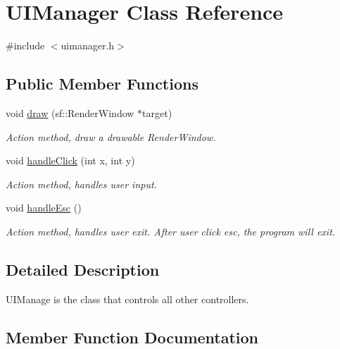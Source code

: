 \hypertarget{class_u_i_manager}{}\section{U\+I\+Manager Class Reference}
\label{class_u_i_manager}


{\ttfamily \#include $<$uimanager.\+h$>$}

\subsection*{Public Member Functions}
\begin{DoxyCompactItemize}
\item 
void \hyperlink{class_u_i_manager_a93440991c435364a9f5b45af839255cb}{draw} (sf\+::\+Render\+Window $\ast$target)
\begin{DoxyCompactList}\small\item\em Action method, draw a drawable Render\+Window. \end{DoxyCompactList}\item 
void \hyperlink{class_u_i_manager_a847b80aeee2eac2ab2680b0346b33ef1}{handle\+Click} (int x, int y)
\begin{DoxyCompactList}\small\item\em Action method, handles user input. \end{DoxyCompactList}\item 
\hypertarget{class_u_i_manager_a247345c268729bc04b5d903a94ccdeaf}{}void \hyperlink{class_u_i_manager_a247345c268729bc04b5d903a94ccdeaf}{handle\+Esc} ()\label{class_u_i_manager_a247345c268729bc04b5d903a94ccdeaf}

\begin{DoxyCompactList}\small\item\em Action method, handles user exit. After user click esc, the program will exit. \end{DoxyCompactList}\end{DoxyCompactItemize}


\subsection{Detailed Description}
U\+I\+Manage is the class that controls all other controllers. 

\subsection{Member Function Documentation}
\hypertarget{class_u_i_manager_a93440991c435364a9f5b45af839255cb}{}
